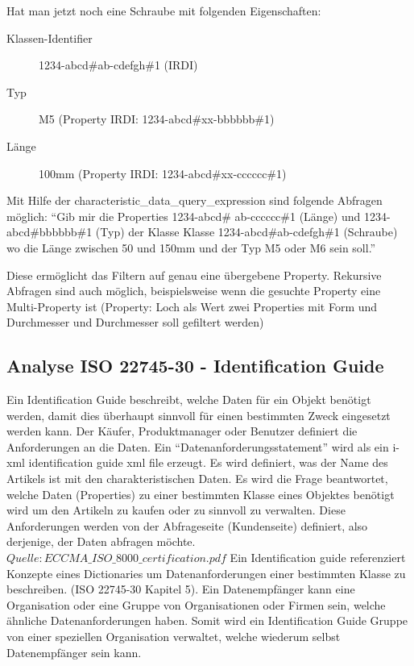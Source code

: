 Hat man jetzt noch eine Schraube mit folgenden Eigenschaften:
\begin{description}
\item[Klassen-Identifier] 1234-abcd\#ab-cdefgh\#1 (IRDI)
\item[Typ] M5 (Property IRDI: 1234-abcd\#xx-bbbbbb\#1)
\item[Länge] 100mm (Property IRDI: 1234-abcd\#xx-cccccc\#1)
\end{description}


Mit Hilfe der characteristic\_data\_query\_expression sind folgende Abfragen möglich:  \enquote{Gib mir die Properties 1234-abcd\# ab-cccccc\#1 (Länge) und 1234-abcd\#bbbbbb\#1 (Typ) der Klasse Klasse 1234-abcd\#ab-cdefgh\#1 (Schraube) wo die Länge zwischen 50 und 150mm und der Typ M5 oder M6 sein soll.}

Diese ermöglicht das Filtern auf genau eine übergebene Property. Rekursive Abfragen sind auch möglich, beispielsweise wenn die gesuchte Property eine Multi-Property ist (Property: Loch als Wert zwei Properties mit Form und Durchmesser und Durchmesser soll gefiltert werden)

\subsection{Analyse ISO 22745-30 - Identification Guide}\label{kap:identification_guide}

Ein Identification Guide beschreibt, welche Daten für ein Objekt benötigt werden, damit dies überhaupt sinnvoll für einen bestimmten Zweck eingesetzt werden kann. Der Käufer, Produktmanager oder Benutzer definiert die Anforderungen an die Daten. Ein  \enquote{Datenanforderungsstatement} wird als ein i-xml identification guide xml file erzeugt. Es wird definiert, was der Name des Artikels ist mit den charakteristischen Daten. Es wird die Frage beantwortet, welche Daten (Properties) zu einer bestimmten Klasse eines Objektes benötigt wird um den Artikeln zu kaufen oder zu sinnvoll zu verwalten. Diese Anforderungen werden von der Abfrageseite (Kundenseite) definiert, also derjenige, der Daten abfragen möchte. \(Quelle: ECCMA\_ISO\_8000\_certification.pdf\) 
Ein Identification guide referenziert Konzepte eines Dictionaries um Datenanforderungen einer bestimmten Klasse zu beschreiben. (ISO 22745-30 Kapitel 5). 
Ein Datenempfänger kann eine Organisation oder eine Gruppe von Organisationen oder Firmen sein, welche ähnliche Datenanforderungen haben. Somit wird ein Identification Guide Gruppe von einer speziellen Organisation verwaltet, welche wiederum selbst Datenempfänger sein kann.  

